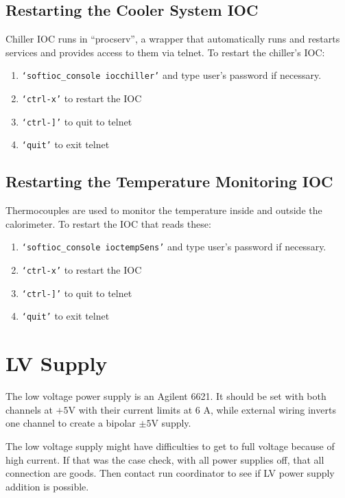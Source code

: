 \documentclass[12pt]{article}
\begin{document}
    \subsection{Restarting the Cooler System IOC}
    Chiller IOC runs in ``procserv'', a wrapper that automatically runs and restarts services and provides access to them via telnet.  To restart the chiller's IOC:
   {\footnotesize
   \begin{enumerate}
       \item \texttt{`softioc\_console iocchiller'} and type user's password if necessary.
       \item \texttt{`ctrl-x'} to restart the IOC
       \item \texttt{`ctrl-]'} to quit to telnet
       \item \texttt{`quit'} to exit telnet
   \end{enumerate}
   }

   \subsection{Restarting the Temperature Monitoring IOC}
   Thermocouples are used to monitor the temperature inside and outside the calorimeter.  To restart the IOC that reads these:
   {\footnotesize
   \begin{enumerate}
       \item \texttt{`softioc\_console ioctempSens'} and type user's password if necessary.
       \item \texttt{`ctrl-x'} to restart the IOC
       \item \texttt{`ctrl-]'} to quit to telnet
       \item \texttt{`quit'} to exit telnet
   \end{enumerate}
   }


\newpage
{\color{blue}
   \section{LV Supply}
   }
      The low voltage power supply is an Agilent 6621.  It should be set with both channels at $+5$V with their current limits at 6 A, while external wiring inverts one channel to create a bipolar $\pm5$V supply. 

      The low voltage supply might have difficulties to get to full voltage because of high current. If that was the case check, with all power supplies off, that all connection are goods. Then contact run coordinator to see if LV power supply addition is possible. 
\end{document}

